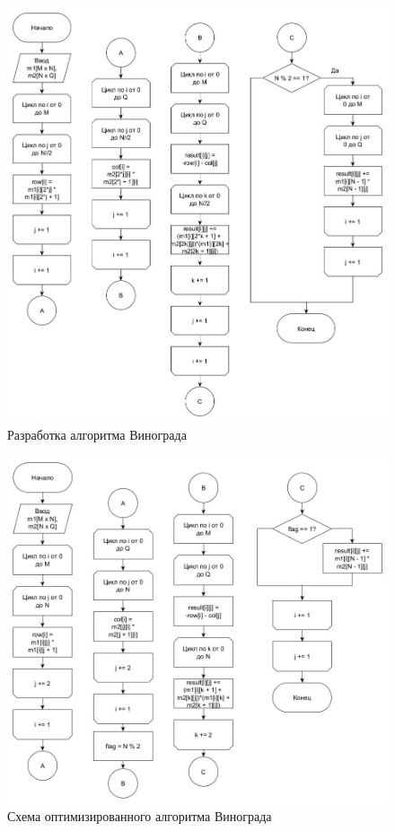 \FloatBarrier
\begin{figure}[hp]
	\begin{center}
		\includegraphics[width=\linewidth]{graph/vinograd.jpg}
	\end{center}
	\caption{Разработка алгоритма Винограда}
\end{figure}
\FloatBarrier

\FloatBarrier
\begin{figure}[hp]
	\begin{center}
		\includegraphics[width=\linewidth]{graph/optvinograd.jpg}
	\end{center}
	\caption{Схема оптимизированного алгоритма Винограда}
\end{figure}
\FloatBarrier

